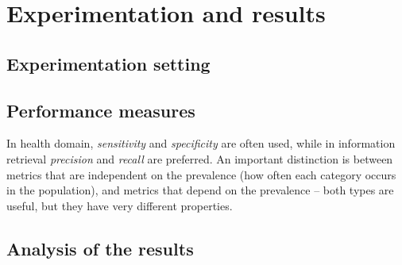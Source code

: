 \section{Experimentation and results}\label{experimentation}

\subsection{Experimentation setting}

\subsection{Performance measures}
In health domain, \emph{sensitivity} and \emph{specificity} are often used, 
while in information retrieval \emph{precision} and \emph{recall} are preferred.
An important distinction is between metrics that are independent on the prevalence
(how often each category occurs in the population), and metrics that depend on the
prevalence – both types are useful, but they have very different properties.

\subsection{Analysis of the results}

